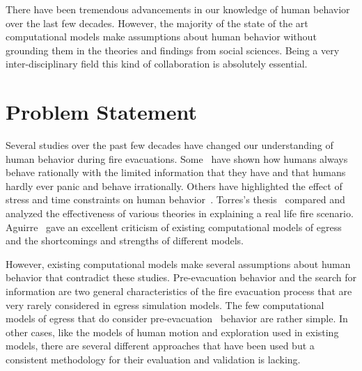 



There have been tremendous advancements in our knowledge of human behavior over the last few decades. However, the majority of the state of the art computational models make assumptions about human behavior without grounding them in the theories and findings from social sciences. Being a very inter-disciplinary field this kind of collaboration is absolutely essential.

\section{Problem Statement}
\label{Intro:ProblemStatement}

Several studies over the past few decades have changed our understanding of human behavior during fire evacuations. Some~\cite{Kobes:2009jx,Schadschneider:2008cz,Reicher:2008ep,Torres:2010tj,Paulsen:1984ti,Sime:1983uy} have shown how humans always behave rationally with the limited information that they have and that humans hardly ever panic and behave irrationally. Others have highlighted the effect of stress and time constraints on human behavior~\cite{Ozel:2001tn}. Torres's thesis~\cite{Torres:2010tj} compared and analyzed the effectiveness of various theories in explaining a real life fire scenario. Aguirre~\cite{Aguirre:2004tn} gave an excellent criticism of existing computational models of egress and the shortcomings and strengths of different models.

However, existing computational models make several assumptions about human behavior that contradict these studies. Pre-evacuation behavior and the search for information are two general characteristics of the fire evacuation process that are very rarely considered in egress simulation models. The few computational models of egress that do consider pre-evacuation~\cite{Pires:2005gs,Klupfel:2003wa} behavior are rather simple. In other cases, like the models of human motion and exploration used in existing models, there are several different approaches that have been used but a consistent methodology for their evaluation and validation is lacking.


